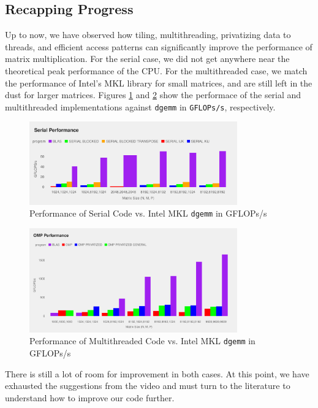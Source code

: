 \documentclass{article}
\begin{document}
\subsection{Recapping Progress}
Up to now, we have observed how tiling, multithreading, privatizing data to threads, and efficient access patterns 
can significantly improve the performance of matrix multiplication. For the serial case, we 
did not get anywhere near the theoretical peak performance of the CPU. For the multithreaded case,
we match the performance of Intel's MKL library for small matrices, and are still left in the dust 
for larger matrices. Figures \ref{FIG:SERIAL-GFLOPS} and \ref{FIG:OMP-GFLOPS} show the performace of the serial and multithreaded implementations
against \texttt{dgemm} in \texttt{GFLOPs/s}, respectively.
\begin{figure}[H]
    \centering
    \includegraphics[width=0.8\textwidth]{../../project/out/serial-gflops.pdf}
    \caption{Performance of Serial Code vs. Intel MKL \texttt{dgemm} in GFLOPs/s}
    \label{FIG:SERIAL-GFLOPS} 
\end{figure}

\begin{figure}[H]
    \centering
    \includegraphics[width=0.8\textwidth]{../../project/out/omp-gflops.pdf}
    \caption{Performance of Multithreaded Code vs. Intel MKL \texttt{dgemm} in GFLOPs/s}
    \label{FIG:OMP-GFLOPS}
\end{figure}
\noindent There is still a lot of room for improvement in both cases. At this point, we have exhausted the suggestions from the video and
must turn to the literature to understand how to improve our code further.
\end{document}
